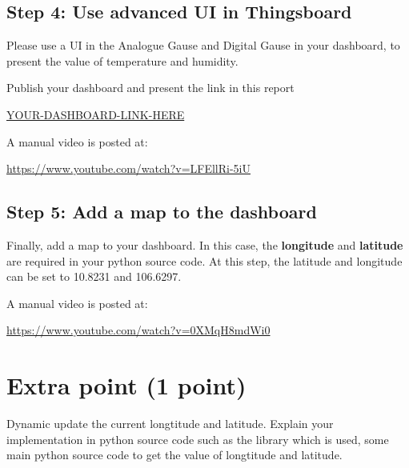 \documentclass[a4paper,11pt]{article}
\theoremstyle{mytheor}
\begin{document}
\subsection{Step 4: Use advanced UI in Thingsboard}
Please use a UI in the Analogue Gause and Digital Gause in your dashboard, to present the value of temperature and humidity.

Publish your dashboard and present the link in this report
\begin{center}
    \url{YOUR-DASHBOARD-LINK-HERE}
\end{center}

A manual video is posted at:
\begin{center}
    \url{https://www.youtube.com/watch?v=LFEllRi-5iU}
\end{center}

\subsection{Step 5: Add a map to the dashboard}
Finally, add a map to your dashboard. In this case, the \textbf{longitude} and \textbf{latitude} are required in your python source code. At this step, the latitude and longitude can be set to 10.8231 and 106.6297.

A manual video is posted at:
\begin{center}
    \url{https://www.youtube.com/watch?v=0XMqH8mdWi0}
\end{center}

\section{Extra point (1 point)}
Dynamic update the current longtitude and latitude. Explain your implementation in python source code such as the library which is used, some main python source code to get the value of longtitude and latitude.
\end{document}
